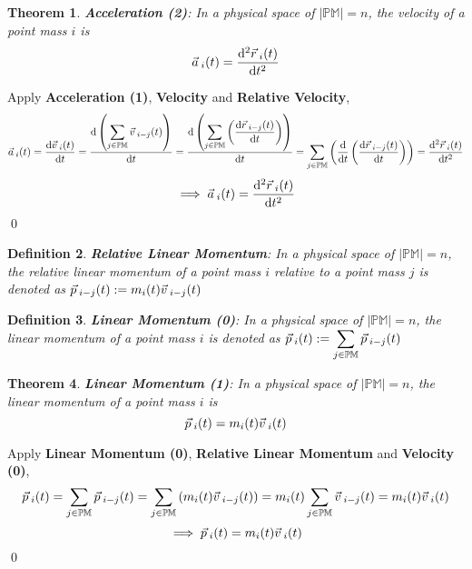 \documentclass[12pt]{amsart}
\newtheorem{theorem}{Theorem}[section]
\newtheorem{definition}[theorem]{Definition}
\renewenvironment{proof}{{\bfseries Proof.}}{\qed}
\let\oldvec\vec
\renewcommand{\vec}[1]{\oldvec{#1}\hspace{0.1em}}
\begin{document}
\begin{theorem}
\textbf{Acceleration (2)}: In a physical space of $\left | \mathbb{PM} \right | = n$, the velocity of a point mass $i$ is $$\vec{a}_i(t) = \dfrac{\mathrm{d}^2 \vec{r}_{i} (t)}{\mathrm{d} t^2}$$
\end{theorem}

\begin{proof}
    Apply \textbf{Acceleration (1)}, \textbf{Velocity} and \textbf{Relative Velocity},
    \begin{align*}
    \vec{a}_i (t) = \dfrac{\mathrm{d} \vec{v}_{i} (t)}{\mathrm{d} t} = \dfrac{\mathrm{d} \left ( \displaystyle \sum_{j \in \mathbb{PM}} \vec{v}_{i-j}(t) \right )}{\mathrm{d} t} = \dfrac{\mathrm{d} \left ( \displaystyle \sum_{j \in \mathbb{PM}} \left ( \dfrac{\mathrm{d} \vec{r}_{i-j}(t)}{\mathrm{d} t} \right ) \right )}{\mathrm{d} t} = \displaystyle \sum_{j \in \mathbb{PM}} \left ( \dfrac{\mathrm{d} }{\mathrm{d} t} \left ( \dfrac{\mathrm{d}  \vec{r}_{i-j}(t) }{\mathrm{d} t} \right ) \right ) = \dfrac{\mathrm{d}^2 \vec{r}_{i} (t)}{\mathrm{d} t^2}
    \end{align*}
    $$\implies \vec{a}_i(t) = \dfrac{\mathrm{d}^2 \vec{r}_{i} (t)}{\mathrm{d} t^2} $$
\end{proof}

\begin{definition}
\textbf{Relative Linear Momentum}: In a physical space of $\left | \mathbb{PM} \right | = n$, the relative linear momentum of a point mass $i$ relative to a point mass $j$ is denoted as $\vec{p}_{i-j} (t) := m_i (t)\vec{v}_{i-j} (t)$ 
\end{definition}

\begin{definition}
\textbf{Linear Momentum (0)}: In a physical space of $\left | \mathbb{PM} \right | = n$, the linear momentum of a point mass $i$ is denoted as $\vec{p}_i(t) := \displaystyle \sum_{j \in \mathbb{PM}} \vec{p}_{i-j} (t)$ 
\end{definition}
 
\begin{theorem}
    \textbf{Linear Momentum (1)}: In a physical space of $\left | \mathbb{PM} \right | = n$, the linear momentum of a point mass $i$ is
    $$\vec{p}_i(t) =  m_i (t)\vec{v}_{i}(t)$$
\end{theorem}

\begin{proof}
    Apply \textbf{Linear Momentum (0)}, \textbf{Relative Linear Momentum} and \textbf{Velocity (0)},
    $$\vec{p}_i(t) =  \displaystyle \sum_{j \in \mathbb{PM}} \vec{p}_{i-j} (t) = \displaystyle \sum_{j \in \mathbb{PM}} \left ( m_i (t)\vec{v}_{i-j} (t) \right ) =  m_i (t) \displaystyle \sum_{j \in \mathbb{PM}} \vec{v}_{i-j} (t) = m_i (t) \vec{v}_i(t) $$
    $$\implies \vec{p}_i(t) = m_i (t)\vec{v}_i(t)$$
\end{proof}
\end{document}
